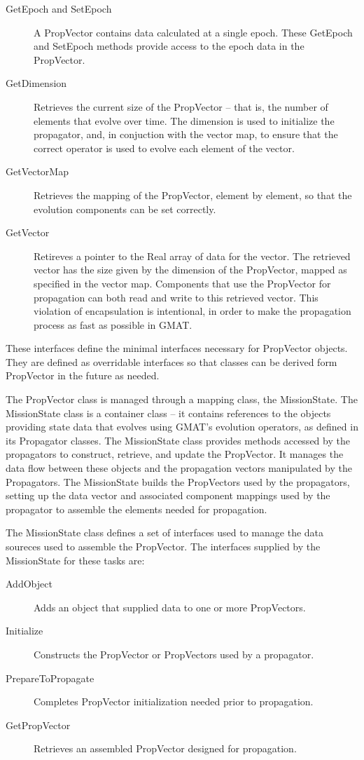 \begin{description}
\item[GetEpoch and SetEpoch]  A PropVector contains data calculated at a single epoch.  These
GetEpoch and SetEpoch methods provide access to the epoch data in the PropVector.
\item[GetDimension]  Retrieves the current size of the PropVector -- that is, the number of
elements that evolve over time.  The dimension is used to initialize the propagator, and, in
conjuction with the vector map, to ensure that the correct operator is used to evolve each element
of the vector.
\item[GetVectorMap]  Retrieves the mapping of the PropVector, element by element, so that the
evolution components can be set correctly.
\item[GetVector]  Retireves a pointer to the Real array of data for the vector.  The retrieved
vector has the size given by the dimension of the PropVector, mapped as specified in the vector
map.  Components that use the PropVector for propagation can both read and write to this retrieved
vector.  This violation of encapsulation is intentional, in order to make the propagation process
as fast as possible in GMAT.
\end{description}

\noindent These interfaces define the minimal interfaces necessary for PropVector objects.  They
are defined as overridable interfaces so that classes can be derived form PropVector in the future
as needed.

The PropVector class is managed through a mapping class, the MissionState.  The MissionState class
is a container class -- it contains references to the objects providing state data that evolves
using GMAT's evolution operators, as defined in its Propagator classes.  The MissionState class
provides methods accessed by the propagators to construct, retrieve, and update the PropVector.  It
manages the data flow between these objects and the propagation vectors manipulated by the
Propagators.  The MissionState builds the PropVectors used by the propagators, setting up the data
vector and associated component mappings used by the propagator to assemble the elements needed for
propagation.

The MissionState class defines a set of interfaces used to manage the data soureces used to assemble
the PropVector.  The interfaces supplied by the MissionState for these tasks are:

\begin{description}
\item[AddObject]  Adds an object that supplied data to one or more PropVectors.
\item[Initialize]  Constructs the PropVector or PropVectors used by a propagator.
\item[PrepareToPropagate] Completes PropVector initialization needed prior to propagation.
\item[GetPropVector]  Retrieves an assembled PropVector designed for propagation.
\end{description}


